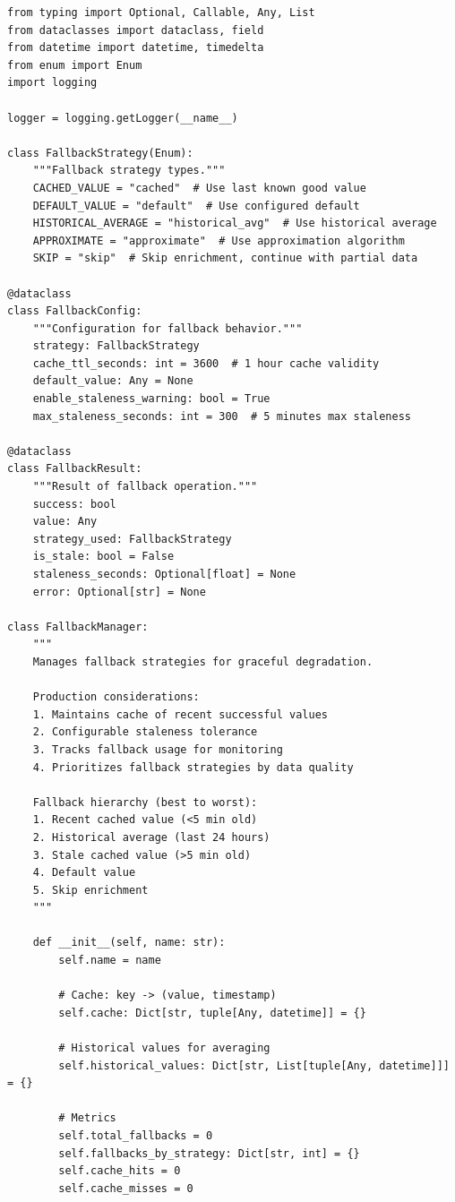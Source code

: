 \begin{lstlisting}[style=python, caption={Fallback Manager for Graceful Degradation}]
from typing import Optional, Callable, Any, List
from dataclasses import dataclass, field
from datetime import datetime, timedelta
from enum import Enum
import logging

logger = logging.getLogger(__name__)

class FallbackStrategy(Enum):
    """Fallback strategy types."""
    CACHED_VALUE = "cached"  # Use last known good value
    DEFAULT_VALUE = "default"  # Use configured default
    HISTORICAL_AVERAGE = "historical_avg"  # Use historical average
    APPROXIMATE = "approximate"  # Use approximation algorithm
    SKIP = "skip"  # Skip enrichment, continue with partial data

@dataclass
class FallbackConfig:
    """Configuration for fallback behavior."""
    strategy: FallbackStrategy
    cache_ttl_seconds: int = 3600  # 1 hour cache validity
    default_value: Any = None
    enable_staleness_warning: bool = True
    max_staleness_seconds: int = 300  # 5 minutes max staleness

@dataclass
class FallbackResult:
    """Result of fallback operation."""
    success: bool
    value: Any
    strategy_used: FallbackStrategy
    is_stale: bool = False
    staleness_seconds: Optional[float] = None
    error: Optional[str] = None

class FallbackManager:
    """
    Manages fallback strategies for graceful degradation.

    Production considerations:
    1. Maintains cache of recent successful values
    2. Configurable staleness tolerance
    3. Tracks fallback usage for monitoring
    4. Prioritizes fallback strategies by data quality

    Fallback hierarchy (best to worst):
    1. Recent cached value (<5 min old)
    2. Historical average (last 24 hours)
    3. Stale cached value (>5 min old)
    4. Default value
    5. Skip enrichment
    """

    def __init__(self, name: str):
        self.name = name

        # Cache: key -> (value, timestamp)
        self.cache: Dict[str, tuple[Any, datetime]] = {}

        # Historical values for averaging
        self.historical_values: Dict[str, List[tuple[Any, datetime]]] = {}

        # Metrics
        self.total_fallbacks = 0
        self.fallbacks_by_strategy: Dict[str, int] = {}
        self.cache_hits = 0
        self.cache_misses = 0


\end{lstlisting}
